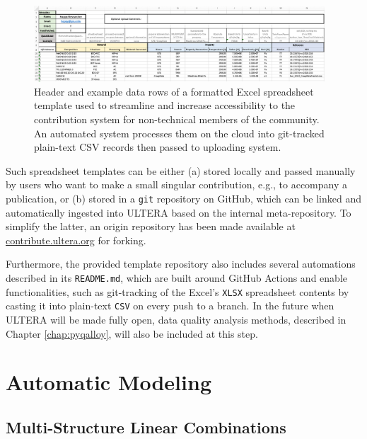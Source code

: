 \begin{figure}[H]
    \centering
    \includegraphics[width=0.97\textwidth]{ultera/ULTERA_Contribute.png}
    \caption{Header and example data rows of a formatted Excel spreadsheet template used to streamline and increase accessibility to the contribution system for non-technical members of the community. An automated system processes them on the cloud into git-tracked plain-text CSV records then passed to uploading system.}
    \label{ultera:fig:contributiontemplate}
\end{figure}

Such spreadsheet templates can be either (a) stored locally and passed manually by users who want to make a small singular contribution, e.g., to accompany a publication, or (b) stored in a \texttt{git} repository on GitHub, which can be linked and automatically ingested into ULTERA based on the internal meta-repository. To simplify the latter, an origin repository has been made available at \href{http://contribute.ultera.org/}{contribute.ultera.org} for forking.

Furthermore, the provided template repository also includes several automations described in its \texttt{README.md}, which are built around GitHub Actions and enable functionalities, such as git-tracking of the Excel's \texttt{XLSX} spreadsheet contents by casting it into plain-text \texttt{CSV} on every push to a branch. In the future when ULTERA will be made fully open, data quality analysis methods, described in Chapter \ref{chap:pyqalloy}, will also be included at this step.


\section{Automatic Modeling} \label{ultera:sec:automodel}

\subsection{Multi-Structure Linear Combinations} \label{ultera:ssec:autolc}

\cite{Chong2021CorrelationAlloys}

